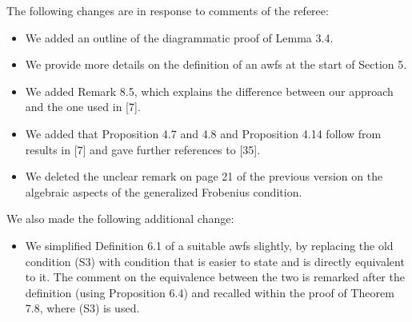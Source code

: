 \documentclass[reqno,10pt,a4paper,oneside,draft]{amsart}
\begin{document}
The following changes are in response to comments of the referee: 

\begin{itemize}
\item We added an outline of the diagrammatic proof of Lemma 3.4. 
\item We provide more details on the definition of an awfs at the start of Section 5. 
\item We added Remark 8.5, which explains the difference between our approach and the one used in [7]. 
\item We added that Proposition 4.7 and 4.8 and Proposition 4.14 follow from results in [7] and gave further references to [35]. 
\item We deleted the unclear remark on page 21 of the previous version on the algebraic aspects of the generalized Frobenius condition.
\end{itemize}


We also made the following additional change:
\begin{itemize}
\item We simplified Definition 6.1 of a suitable awfs slightly, by replacing the old condition (S3) with condition that is
easier to state and is directly equivalent to it. The comment on the equivalence between the two is remarked after
the definition (using Proposition 6.4) and recalled within the proof of Theorem 7.8, where (S3) is used.
\end{itemize}
\end{document}
